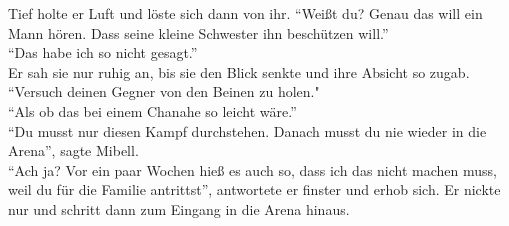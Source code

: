 Tief holte er Luft und löste sich dann von ihr. ``Weißt du? Genau das will ein Mann hören. Dass 
seine kleine Schwester ihn beschützen will.''\\
``Das habe ich so nicht gesagt.''\\
Er sah sie nur ruhig an, bis sie den Blick senkte und ihre Absicht so zugab. \\
``Versuch deinen Gegner von den Beinen zu holen."\\
``Als ob das bei einem Chanahe so leicht wäre.''\\
``Du musst nur diesen Kampf durchstehen. Danach musst du nie wieder in die Arena'', sagte Mibell.\\
``Ach ja? Vor ein paar Wochen hieß es auch so, dass ich das nicht machen muss, weil du für die 
Familie antrittst'', antwortete er finster und erhob sich. Er nickte nur und schritt dann zum 
Eingang in die Arena hinaus. \\


